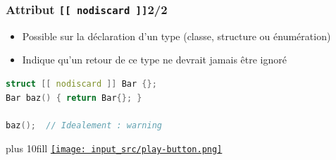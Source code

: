 \documentclass[C++.tex]{subfiles}
\begin{document}
\begin{frame}[fragile]
	\frametitle{Attribut \lstinline|[[ nodiscard ]]|\titlehfill{}2/2}
	\begin{itemize}
		\item Possible sur la déclaration d'un type (classe, structure ou énumération)
		\item Indique qu'un retour de ce type ne devrait jamais être ignoré
	\end{itemize}

	\begin{lstlisting}[language=C++]
struct [[ nodiscard ]] Bar {};
Bar baz() { return Bar{}; }

baz();  // Idealement : warning\end{lstlisting}

	\vskip 10mm plus 10fill
	\hfill
	\href{https://godbolt.org/#g:!((g:!((g:!((h:codeEditor,i:(filename:'1',fontScale:14,fontUsePx:'0',j:1,lang:c%2B%2B,selection:(endColumn:1,endLineNumber:22,positionColumn:1,positionLineNumber:22,selectionStartColumn:1,selectionStartLineNumber:22,startColumn:1,startLineNumber:22),source:'%23include+%3Ciostream%3E%0A%0A%5B%5B+nodiscard+%5D%5D+static+int+foo()%0A%7B%0A++return+5%3B%0A%7D%0A%0Astruct+%5B%5B+nodiscard+%5D%5D+Bar%0A%7B%0A%7D%3B%0A%0Astatic+Bar+baz()%0A%7B%0A++return+Bar%7B%7D%3B%0A%7D%0A%0Aint+main()%0A%7B%0A++foo()%3B%0A++baz()%3B%0A%7D%0A'),l:'5',n:'0',o:'C%2B%2B+source+%231',t:'0')),k:50,l:'4',n:'0',o:'',s:0,t:'0'),(g:!((h:executor,i:(argsPanelShown:'1',compilationPanelShown:'0',compiler:g112,compilerOutShown:'0',execArgs:'',execStdin:'',fontScale:14,fontUsePx:'0',j:1,lang:c%2B%2B,libs:!((name:boost,ver:'175')),options:'-std%3Dc%2B%2B17+-Wall+-Wextra',source:1,stdinPanelShown:'1',tree:'1',wrap:'0'),l:'5',n:'0',o:'Executor+x86-64+gcc+11.2+(C%2B%2B,+Editor+%231)',t:'0')),header:(),k:50,l:'4',n:'0',o:'',s:0,t:'0')),l:'2',n:'0',o:'',t:'0')),version:4}{\texttt{[image: input\_src/play-button.png]}}
\end{frame}
\end{document}
